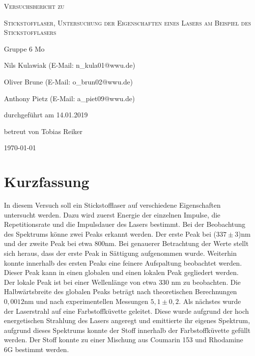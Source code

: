 \documentclass[
	a4paper,
	12pt,
	pagesize,
	ngerman
]{scrartcl}
\begin{document}
\begin{titlepage}
	\centering
	{\scshape\LARGE Versuchsbericht zu \par}
	\vspace{1cm}
	{\scshape\huge Stickstofflaser, Untersuchung der Eigenschaften eines Lasers am Beispiel des Stickstofflasers     \par}
	\vspace{2.5cm}
	{\LARGE Gruppe 6 Mo\par}
	\vspace{0.5cm}
	{\large Nils Kulawiak (E-Mail: n\_kula01@wwu.de) \par}
	{\large Oliver Brune (E-Mail: o\_brun02@wwu.de) \par}
	{\large Anthony Pietz (E-Mail: a\_piet09@wwu.de) \par}
	\vfill
	durchgeführt am 14.01.2019\par
	
	\vfill
	betreut von Tobias Reiker\par
	
	\vfill
	{\large \today\par}
\end{titlepage}

\tableofcontents
\newpage

\section{Kurzfassung}
In diesem Versuch soll ein Stickstofflaser auf verschiedene Eigenschaften untersucht werden. Dazu wird zuerst Energie der einzelnen Impulse, die Repetitionsrate und die Impulsdauer des Lasers bestimmt.
Bei der Beobachtung des Spektrums könne zwei Peaks erkannt werden. Der erste Peak bei ($337 \pm 3$)nm und der zweite Peak bei etwa $800$nm. Bei genauerer Betrachtung der Werte stellt sich heraus, dass der erste Peak in Sättigung aufgenommen wurde. Weiterhin konnte innerhalb des ersten Peaks eine feinere Aufspaltung beobachtet werden. Dieser Peak kann in einen globalen und einen lokalen Peak gegliedert werden. Der lokale Peak ist bei einer Wellenlänge von etwa $330$ nm zu beobachten.
Die Halbwärtsbreite des globalen Peaks beträgt nach theoretischen Berechnungen $0,0012$nm und nach experimentellen Messungen $5,1 \pm 0,2$.
Als nächstes wurde der Laserstrahl auf eine Farbstoffküvette geleitet. Diese wurde aufgrund der hoch energetischen Strahlung des Lasers angeregt und emittierte ihr eigenes Spektrum, aufgrund dieses Spektrums konnte der Stoff innerhalb der Farbstoffküvette gefüllt werden. Der Stoff konnte zu einer Mischung aus Coumarin 153 und Rhodamine 6G bestimmt werden.
\end{document}
